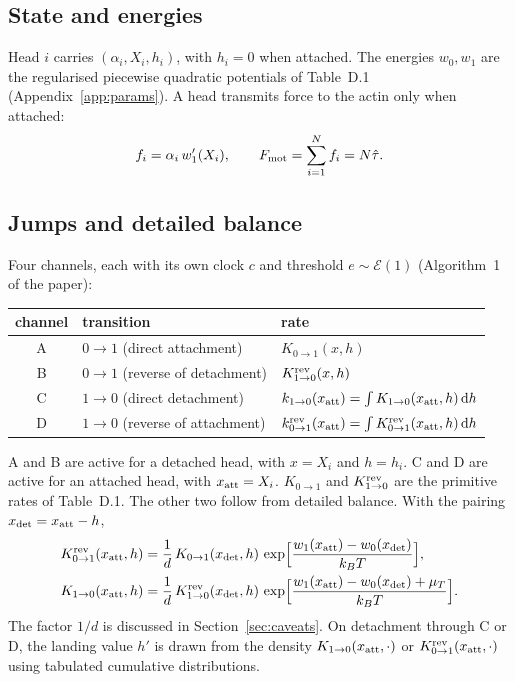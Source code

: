 \documentclass[11pt,a4paper]{article}
\newcommand{\kBT}{k_BT}
\newcommand{\dd}{\mathrm{d}}
\begin{document}
\subsection{State and energies}
Head $i$ carries $(\alpha_i,X_i,h_i)$, with $h_i=0$ when attached. The energies $w_0,w_1$ are the regularised piecewise quadratic potentials of Table~D.1 (Appendix~\ref{app:params}). A head transmits force to the actin only when attached:
\begin{equation}
f_i=\alpha_i\,w_1'(X_i),\qquad F_{\rm mot}=\sum_{i=1}^Nf_i=N\hat\tau .
\end{equation}

\subsection{Jumps and detailed balance}
Four channels, each with its own clock $c$ and threshold $e\sim\mathcal E(1)$ (Algorithm~1 of the paper):
\begin{center}
\begin{tabular}{cll}
\toprule
channel & transition & rate \\
\midrule
A & $0\to1$ (direct attachment) & $K_{0\to1}(x,h)$ \\
B & $0\to1$ (reverse of detachment) & $K^{\rm rev}_{1\to0}(x,h)$ \\
C & $1\to0$ (direct detachment) & $k_{1\to0}(x_{\rm att})=\int K_{1\to0}(x_{\rm att},h)\,\dd h$ \\
D & $1\to0$ (reverse of attachment) & $k^{\rm rev}_{0\to1}(x_{\rm att})=\int K^{\rm rev}_{0\to1}(x_{\rm att},h)\,\dd h$ \\
\bottomrule
\end{tabular}
\end{center}
A and B are active for a detached head, with $x=X_i$ and $h=h_i$. C and D are active for an attached head, with $x_{\rm att}=X_i$. $K_{0\to1}$ and $K^{\rm rev}_{1\to0}$ are the primitive rates of Table~D.1. The other two follow from detailed balance. With the pairing $x_{\rm det}=x_{\rm att}-h$,
\begin{align}
K^{\rm rev}_{0\to1}(x_{\rm att},h)&=\frac1d\,K_{0\to1}(x_{\rm det},h)\,\exp\!\Big[\frac{w_1(x_{\rm att})-w_0(x_{\rm det})}{\kBT}\Big],\\
K_{1\to0}(x_{\rm att},h)&=\frac1d\,K^{\rm rev}_{1\to0}(x_{\rm det},h)\,\exp\!\Big[\frac{w_1(x_{\rm att})-w_0(x_{\rm det})+\mu_T}{\kBT}\Big].
\end{align}
The factor $1/d$ is discussed in Section~\ref{sec:caveats}. On detachment through C or D, the landing value $h'$ is drawn from the density $K_{1\to0}(x_{\rm att},\cdot)$ or $K^{\rm rev}_{0\to1}(x_{\rm att},\cdot)$ using tabulated cumulative distributions.
\end{document}
